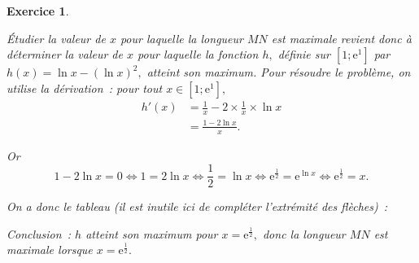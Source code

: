 \documentclass[10pt]{article}
\newtheorem{exo}{Exercice}
\begin{document}
\begin{exo}
\begin{enumerate}
Étudier la valeur de $x$ pour laquelle la longueur $MN$ est maximale revient donc à déterminer la valeur de $x$ pour laquelle la fonction $h,$ définie sur $\left[1;\text{e}^1\right]$ par $h(x)=\ln x-(\ln x)^2,$ atteint son maximum. Pour résoudre le problème, on utilise la dérivation~: pour tout $x\in \left[1;\text{e}^1\right],$
\begin{align*}h'(x)&=\frac{1}{x}-2\times\frac{1}{x}\times\ln x\\
&=\frac{1-2\ln x}{x}.
\end{align*}

Or \[1-2\ln x=0\iff 1=2\ln x\iff \frac{1}{2}=\ln x\iff \text{e}^{\frac{1}{2}}=\text{e}^{\ln x}\iff \text{e}^{\frac{1}{2}}=x.\]

On a donc le tableau (il est inutile ici de compléter l'extrémité des flèches)~:

\medskip
\begin{center}
\end{center}

\medskip

Conclusion~: $h$ atteint son maximum pour $x=\text{e}^{\frac{1}{2}},$ donc la longueur $MN$ est maximale lorsque $x=\text{e}^{\frac{1}{2}}.$


\end{enumerate}
\end{exo}
\end{document}
